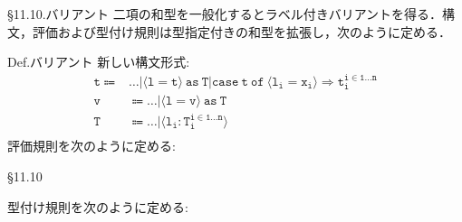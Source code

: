 \documentclass[9pt]{beamer}
\begin{document}
\begin{frame}{\S11.10.バリアント}
二項の和型を一般化するとラベル付きバリアントを得る．構文，評価および型付け規則は型指定付きの和型を拡張し，次のように定める．\begin{alertblock}{Def.バリアント}
新しい構文形式:\begin{align*}
\mathtt{t}\Coloneq&\mathtt{\ldots|\langle l=t\rangle\ as\ T|case\ t\ of\ \langle l_{i}=x_{i}\rangle\Rightarrow t_{i}^{i\in1\ldots n}}\\
\mathtt{v}&\Coloneq\mathtt{\ldots|\langle l=v\rangle\ as\ T}\\
\mathtt{T}&\Coloneq\mathtt{\ldots|\langle l_{i}:T_{i}^{i\in1\ldots n}\rangle}\\
\end{align*}
評価規則を次のように定める:
\end{alertblock}
\end{frame}
\begin{frame}{\S11.10}
\begin{alertblock}{}
型付け規則を次のように定める:
\end{alertblock}
\end{frame}
\end{document}
